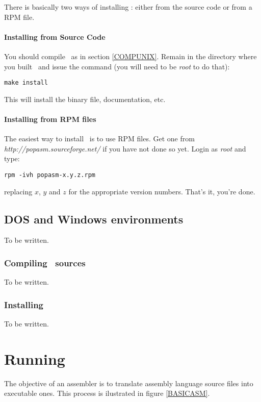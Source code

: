 \documentclass[a4paper,draft,12pt]{book}
\begin{document}
There is basically two ways of installing \popasm: either from
the source code or from a RPM file.

\subsubsection{Installing from Source Code}
You should compile \popasm\ as in section \ref{COMPUNIX}. Remain
in the directory where you built \popasm\ and issue the command
(you will need to be \emph{root} to do that):

\begin{verbatim}
make install
\end{verbatim}

This will install the binary file, documentation, etc.

\subsubsection{Installing from RPM files}
The easiest way to install \popasm\ is to use RPM files. Get one from
\emph{http://popasm.sourceforge.net/} if you have not done so yet.
Login as \emph{root} and type:

\begin{verbatim}
rpm -ivh popasm-x.y.z.rpm
\end{verbatim}

replacing $x$, $y$ and $z$ for the appropriate version numbers. That's
it, you're done.

\section{DOS and Windows environments}
To be written.

\subsection{Compiling \popasm\ sources\label{COMPDOS}}
To be written.

\subsection{Installing \popasm}
To be written.

\chapter{Running \popasm\label{CMDLINE}}

The objective of an assembler is to translate assembly language source
files into executable ones. This process is ilustrated in figure \ref{BASICASM}.
\end{document}
